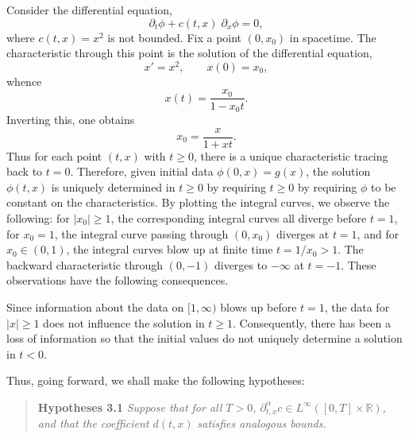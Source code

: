 \documentclass{article}
\begin{document}
\begin{example}
	Consider the differential equation, 
	\begin{equation*}
		\partial_{t}\phi + c(t, x)\;\partial_{x}\phi = 0, 
	\end{equation*}
	where $c(t, x) = x^{2}$ is not bounded. Fix a point $(0,x_{0})$ in spacetime. The characteristic through this point is the solution of the differential equation, 
	\begin{equation*}
		x' = x^{2}, \qquad x(0) = x_{0}, 
	\end{equation*}
	whence 
	\begin{equation*}
		x(t) = \frac{x_{0}}{1 - x_{0}t}. 
	\end{equation*}
	Inverting this, one obtains 
	\begin{equation*}
		x_{0} = \frac{x}{1 + xt}. 
	\end{equation*}
	Thus for each point $(t, x)$ with $t \geq 0$, there is a unique characteristic tracing back to $t = 0$. Therefore, given initial data $\phi(0,x) = g(x)$, the solution $\phi(t, x)$ is uniquely determined in $t \geq 0$ by requiring $t \geq 0$ by requiring $\phi$ to be constant on the characteristics. By plotting the integral curves, we observe the following: for $|x_{0}| \geq 1$, the corresponding integral curves all diverge before $t = 1$, for $x_{0} = 1$, the integral curve passing through $(0,x_{0})$ diverges at $t = 1$, and for $x_{0} \in (0,1)$, the integral curves blow up at finite time $t = 1/x_{0} > 1$. The backward characteristic through $(0,-1)$ diverges to $-\infty$ at $t = -1$. These observations have the following consequences. 
	
	Since information about the data on $[1, \infty)$ blows up before $t = 1$, the data for $|x| \geq 1$ does not influence the solution in $t \geq 1$. Consequently, there has been a loss of information so that the initial values do not uniquely determine a solution in $t < 0$. 
\end{example} 

Thus, going forward, we shall make the following hypotheses: 

\begin{quote}
	\textbf{Hypotheses 3.1} \textit{Suppose that for all $T > 0$, $\partial_{t, x}^{\alpha}c \in L^{\infty}([0, T] \times \mathbb{R})$, and that the coefficient $d(t, x)$ satisfies analogous bounds.}
\end{quote}
\end{document}
